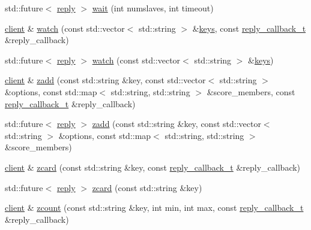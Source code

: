 \begin{DoxyCompactItemize}
\item 
std\+::future$<$ \hyperlink{classcpp__redis_1_1reply}{reply} $>$ \hyperlink{classcpp__redis_1_1client_a4ef6f516a3dcdea1b317bb4e5e96e680}{wait} (int numslaves, int timeout)
\item 
\hyperlink{classcpp__redis_1_1client}{client} \& \hyperlink{classcpp__redis_1_1client_a7faae4f59e4b7f5b5003dcfbbf04af89}{watch} (const std\+::vector$<$ std\+::string $>$ \&\hyperlink{classcpp__redis_1_1client_acb7845a206b2321e6919c2f38282c322}{keys}, const \hyperlink{classcpp__redis_1_1client_a061a1140d36d2eaeda82b09a0bb3f9f2}{reply\+\_\+callback\+\_\+t} \&reply\+\_\+callback)
\item 
std\+::future$<$ \hyperlink{classcpp__redis_1_1reply}{reply} $>$ \hyperlink{classcpp__redis_1_1client_a437606353878a903033ced5cb56ed07c}{watch} (const std\+::vector$<$ std\+::string $>$ \&\hyperlink{classcpp__redis_1_1client_acb7845a206b2321e6919c2f38282c322}{keys})
\item 
\hyperlink{classcpp__redis_1_1client}{client} \& \hyperlink{classcpp__redis_1_1client_aaea3a3c79956cabb6709fb6cd3e01739}{zadd} (const std\+::string \&key, const std\+::vector$<$ std\+::string $>$ \&options, const std\+::map$<$ std\+::string, std\+::string $>$ \&score\+\_\+members, const \hyperlink{classcpp__redis_1_1client_a061a1140d36d2eaeda82b09a0bb3f9f2}{reply\+\_\+callback\+\_\+t} \&reply\+\_\+callback)
\item 
std\+::future$<$ \hyperlink{classcpp__redis_1_1reply}{reply} $>$ \hyperlink{classcpp__redis_1_1client_a9c6ec329f626304b629c6ff17ea9bc6b}{zadd} (const std\+::string \&key, const std\+::vector$<$ std\+::string $>$ \&options, const std\+::map$<$ std\+::string, std\+::string $>$ \&score\+\_\+members)
\item 
\hyperlink{classcpp__redis_1_1client}{client} \& \hyperlink{classcpp__redis_1_1client_a54259186a650211cc8b5fb70af1384ba}{zcard} (const std\+::string \&key, const \hyperlink{classcpp__redis_1_1client_a061a1140d36d2eaeda82b09a0bb3f9f2}{reply\+\_\+callback\+\_\+t} \&reply\+\_\+callback)
\item 
std\+::future$<$ \hyperlink{classcpp__redis_1_1reply}{reply} $>$ \hyperlink{classcpp__redis_1_1client_a9cfeae7394f3fa2b3ff7ec1f1c56ca1b}{zcard} (const std\+::string \&key)
\item 
\hyperlink{classcpp__redis_1_1client}{client} \& \hyperlink{classcpp__redis_1_1client_a405463c110eb39e66163f0d936e42815}{zcount} (const std\+::string \&key, int min, int max, const \hyperlink{classcpp__redis_1_1client_a061a1140d36d2eaeda82b09a0bb3f9f2}{reply\+\_\+callback\+\_\+t} \&reply\+\_\+callback)

\end{DoxyCompactItemize}

